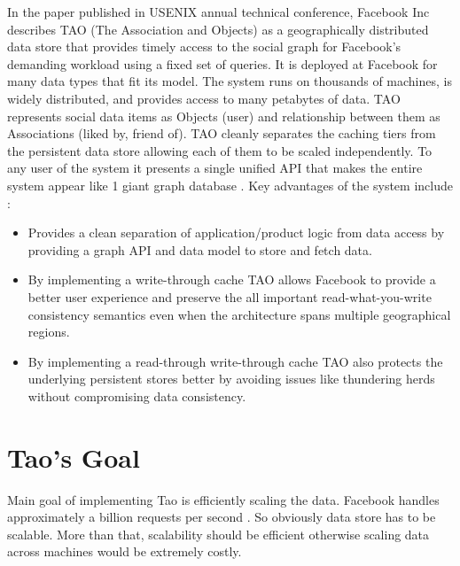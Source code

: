 \documentclass[9pt,twocolumn,twoside]{../../styles/osajnl}
\begin{document}
In the paper published in USENIX annual technical conference, Facebook Inc describes TAO (The Association and Objects) as \cite{book-tao1} a geographically distributed data store that provides timely access to the social graph for Facebook’s demanding workload using a fixed set of queries.
It is deployed at Facebook for many data types that fit its model. The system runs on thousands of machines, is widely distributed, and provides access to many petabytes of data. TAO represents social data items as Objects (user) and relationship between them as Associations (liked by, friend of). TAO cleanly separates the caching tiers from the persistent data store allowing each of them to be scaled independently. To any user of the system it presents a single unified API that makes the entire system appear like 1 giant graph database \cite{www-tao1}.
Key advantages of the system include \cite{www-tao1}:
\begin{itemize}
\item Provides a clean separation of application/product logic from data access by providing a graph API and data model to store and fetch data.
\item By implementing a write-through cache TAO allows Facebook to provide a better user experience and preserve the all important read-what-you-write consistency semantics even when the architecture spans multiple geographical regions.
\item By implementing a read-through write-through cache TAO also protects the underlying persistent stores better by avoiding issues like thundering herds without compromising data consistency.

\end{itemize}

\section{Tao's Goal}
Main goal of implementing Tao is efficiently scaling the data. Facebook handles approximately a billion requests per second \cite{www-tao4}. So obviously data store has to be scalable. More than that, scalability should be efficient otherwise scaling data across machines would be extremely costly. 
\end{document}

